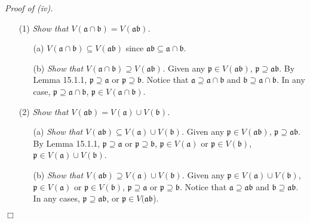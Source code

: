 \documentclass{article}
\begin{document}
\emph{Proof of (iv).}
\begin{enumerate}
\item[(1)]
\emph{Show that $V(\mathfrak{a} \cap \mathfrak{b}) = V(\mathfrak{a} \mathfrak{b})$.}
  \begin{enumerate}
  \item[(a)]
    \emph{$V(\mathfrak{a} \cap \mathfrak{b}) \subseteq V(\mathfrak{a} \mathfrak{b})$}
    since $\mathfrak{a} \mathfrak{b} \subseteq \mathfrak{a} \cap \mathfrak{b}$.

  \item[(b)]
    \emph{Show that $V(\mathfrak{a} \cap \mathfrak{b}) \supseteq V(\mathfrak{a} \mathfrak{b})$.}
    Given any $\mathfrak{p} \in V(\mathfrak{a} \mathfrak{b})$,
    $\mathfrak{p} \supseteq \mathfrak{a} \mathfrak{b}$.
    By Lemma 15.1.1, $\mathfrak{p} \supseteq \mathfrak{a}$ or $\mathfrak{p} \supseteq \mathfrak{b}$.
    Notice that $\mathfrak{a} \supseteq \mathfrak{a \cap b}$
    and $\mathfrak{b} \supseteq \mathfrak{a \cap b}$.
    In any case, $\mathfrak{p} \supseteq \mathfrak{a \cap b}$,
    $\mathfrak{p} \in V(\mathfrak{a} \cap \mathfrak{b})$.
  \end{enumerate}

\item[(2)]
\emph{Show that $V(\mathfrak{a} \mathfrak{b}) = V(\mathfrak{a}) \cup V(\mathfrak{b})$.}
  \begin{enumerate}
  \item[(a)]
    \emph{Show that $V(\mathfrak{a} \mathfrak{b})
    \subseteq V(\mathfrak{a}) \cup V(\mathfrak{b})$.}
    Given any $\mathfrak{p} \in V(\mathfrak{a} \mathfrak{b})$,
    $\mathfrak{p} \supseteq \mathfrak{a} \mathfrak{b}$.
    By Lemma 15.1.1,
    $\mathfrak{p} \supseteq \mathfrak{a}$ or $\mathfrak{p} \supseteq \mathfrak{b}$,
    $\mathfrak{p} \in V(\mathfrak{a})$ or $\mathfrak{p} \in V(\mathfrak{b})$,
    $\mathfrak{p} \in V(\mathfrak{a}) \cup V(\mathfrak{b})$.
  
  \item[(b)]
    \emph{Show that $V(\mathfrak{a} \mathfrak{b})
    \supseteq V(\mathfrak{a}) \cup V(\mathfrak{b})$.}
    Given any $\mathfrak{p} \in V(\mathfrak{a}) \cup V(\mathfrak{b})$,
    $\mathfrak{p} \in V(\mathfrak{a})$ or $\mathfrak{p} \in V(\mathfrak{b})$,
    $\mathfrak{p} \supseteq \mathfrak{a}$ or $\mathfrak{p} \supseteq \mathfrak{b}$.
    Notice that $\mathfrak{a} \supseteq \mathfrak{ab}$
    and $\mathfrak{b} \supseteq \mathfrak{ab}$.
    In any cases, $\mathfrak{p} \supseteq \mathfrak{ab}$,
    or $\mathfrak{p} \in V(\mathfrak{ab}$).
  \end{enumerate}
\end{enumerate}
$\Box$ \\\\
\end{document}
